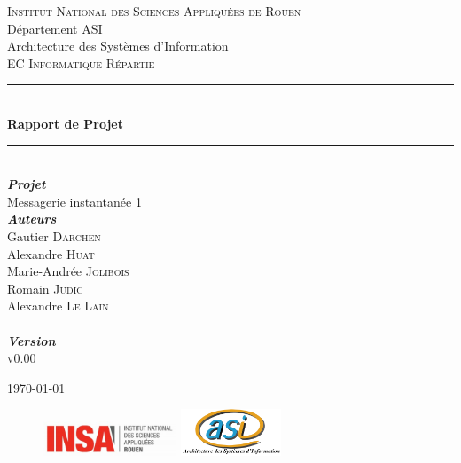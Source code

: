 \documentclass[11pt,dvipsnames,svgnames]{report}
\begin{document}
\begin{titlepage}
\newcommand{\HRule}{\rule{\linewidth}{0.5mm}}
\center
{}\textsc{\huge Institut National des Sciences Appliquées de Rouen}\\[0.7cm]
\LARGE Département ASI~\\[0.5cm]
\Large{Architecture des Systèmes d'Information} ~\\[1.5cm]
\textsc{\Large EC Informatique Répartie}\\[0.5cm]

\HRule \\[0.4cm]
{ \huge \bfseries Rapport de Projet}\\[0.18cm] \HRule \\[1.5cm]

\LARGE \emph{\textbf{Projet}} \\
{Messagerie instantanée 1}\\[1.3cm]

\large
	\emph{\textbf{Auteurs}}\\
	Gautier \textsc{Darchen} \\
	Alexandre \textsc{Huat} \\
	Marie-Andrée \textsc{Jolibois} \\
	Romain \textsc{Judic} \\
	Alexandre \textsc{Le Lain}\\[0.3cm]

~\\[0.5cm]
\Large \emph{\textbf{Version}}\\
	\textsc{v0.00}

\vfill{\today}

\begin{figure}
\includegraphics[width=4cm]{images/LogoINSA.png}\hfill
\includegraphics[width=3cm]{images/logoasi.png}
\end{figure}


 \end{titlepage}
\end{document}
